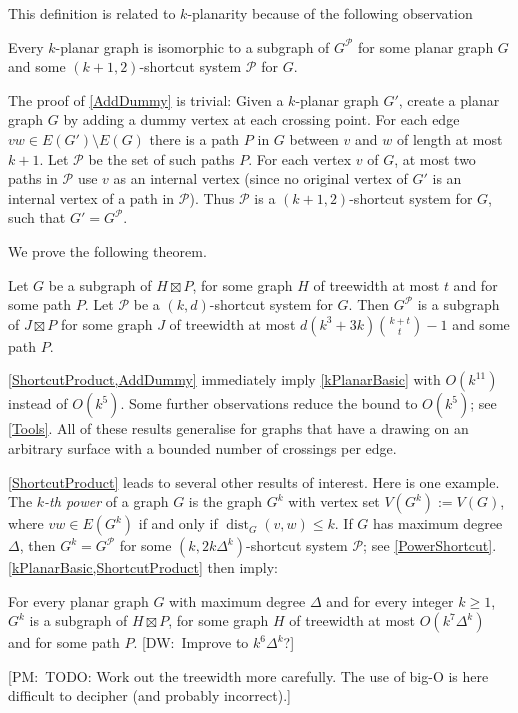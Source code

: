 \documentclass{patmorin}
\newcommand{\note}[2]{{\color{red}[#1:~#2]}}
\DeclareMathOperator{\dist}{dist}
\newcommand{\PP}{\mathcal{P}}
\renewcommand{\geq}{\geqslant}
\renewcommand{\leq}{\leqslant}
\begin{document}
This definition is related to $k$-planarity because of the following observation 

\begin{obs}
\label{AddDummy}
Every $k$-planar graph is isomorphic to a subgraph of $G^\PP$ for some planar graph $G$ and some $(k+1,2)$-shortcut system $\PP$ for $G$. 
\end{obs}

The proof of \cref{AddDummy} is trivial: Given a $k$-planar graph $G'$, create a planar graph $G$ by adding a dummy vertex at each crossing point. For each edge $vw\in E(G')\setminus E(G)$ there is a path $P$ in $G$ between $v$ and $w$ of length at most $k+1$. Let $\PP$ be the set of such paths $P$. For each vertex $v$ of $G$, at most two paths in $\PP$ use $v$ as an internal vertex (since no original vertex of $G'$ is an internal vertex of a path in $\PP$). Thus $\PP$ is a $(k+1,2)$-shortcut system for $G$, such that $G'=G^\PP$. 

We prove the following theorem.

\begin{thm}
\label{ShortcutProduct}
Let $G$ be a subgraph of $H\boxtimes P$, for some graph $H$ of treewidth at most $t$ and for some path $P$. 
Let $\PP$ be a $(k,d)$-shortcut system for $G$. Then $G^\PP$ is a subgraph of $J\boxtimes P$ for some graph $J$ of treewidth at most $d(k^3+3k)\binom{k+t}{t}-1$ and some path $P$. 
\end{thm}

\cref{ShortcutProduct,AddDummy} immediately imply \cref{kPlanarBasic} with $O(k^{11})$ instead of $O(k^5)$. Some further observations reduce the bound to $O(k^5)$; see \cref{Tools}. All of these results  generalise for graphs that have a drawing on an arbitrary surface with a bounded number of crossings per edge. 

\cref{ShortcutProduct} leads to several other results of interest. Here is one example. The \emph{$k$-th power} of a graph $G$ is the graph $G^k$ with vertex set $V(G^k):=V(G)$, where $vw\in E(G^k)$ if and only if $\dist_G(v,w)\leq k$. If $G$ has maximum degree $\Delta$, then $G^k = G^\PP$ for some $(k,2k\Delta^{k})$-shortcut system $\PP$; see \cref{PowerShortcut}. \cref{kPlanarBasic,ShortcutProduct} then imply:


\begin{thm}
\label{kPowerBasic}
For every planar graph $G$ with maximum degree $\Delta$ and for every integer $k\geq 1$, $G^k$ is a subgraph of $H\boxtimes P$, for some graph $H$ of treewidth at most $O( k^7 \Delta^{k})$ and for some path $P$. \note{DW}{Improve to $k^6\Delta^{k}$?}
\end{thm}
\note{PM}{TODO: Work out the treewidth more carefully. The use of big-O is here difficult to decipher (and probably incorrect).}
\end{document}
